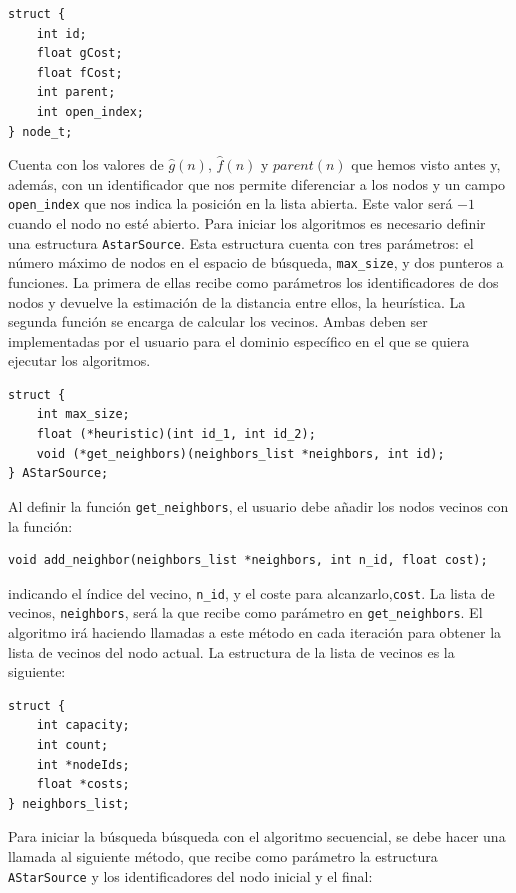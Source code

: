 \documentclass[a4paper,12pt]{article}
\begin{document}
\begin{lstlisting}
struct {
    int id;
    float gCost;
    float fCost;
    int parent;
    int open_index;
} node_t;
\end{lstlisting}

Cuenta con los valores de $\hat{g}(n)$, $\hat{f}(n)$ y $parent(n)$ que hemos visto antes y, además, con un identificador que nos permite diferenciar a los nodos y un campo \verb|open_index| que nos indica la posición en la lista abierta. Este valor será $-1$ cuando el nodo no esté abierto. Para iniciar los algoritmos es necesario definir una estructura \verb|AstarSource|. Esta estructura cuenta con tres parámetros: el número máximo de nodos en el espacio de búsqueda, \verb|max_size|, y dos punteros a funciones. La primera de ellas recibe como parámetros los identificadores de dos nodos y devuelve la estimación de la distancia entre ellos, la heurística. La segunda función se encarga de calcular los vecinos. Ambas deben ser implementadas por el usuario para el dominio específico en el que se quiera ejecutar los algoritmos.

\begin{lstlisting}
struct {
    int max_size;
    float (*heuristic)(int id_1, int id_2);
    void (*get_neighbors)(neighbors_list *neighbors, int id);
} AStarSource;
\end{lstlisting}

Al definir la función \verb|get_neighbors|, el usuario debe añadir los nodos vecinos con la función:

\begin{lstlisting}
void add_neighbor(neighbors_list *neighbors, int n_id, float cost);
\end{lstlisting}

\noindent indicando el índice del vecino, \verb|n_id|, y el coste para alcanzarlo,\verb|cost|. La lista de vecinos, \verb|neighbors|, será la que recibe como parámetro en \verb|get_neighbors|. El algoritmo irá haciendo llamadas a este método en cada iteración para obtener la lista de vecinos del nodo actual. La estructura de la lista de vecinos es la siguiente:

\begin{lstlisting}
struct {
    int capacity;
    int count;
    int *nodeIds;
    float *costs;
} neighbors_list;
\end{lstlisting}

Para iniciar la búsqueda búsqueda con el algoritmo secuencial, se debe hacer una llamada al siguiente método, que recibe como parámetro la estructura \verb|AStarSource| y los identificadores del nodo inicial y el final:
\end{document}
